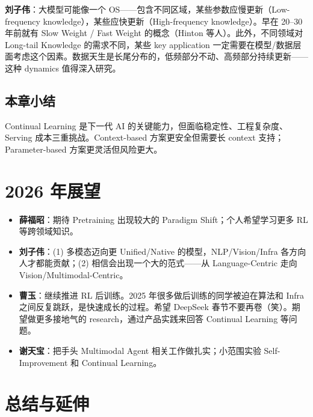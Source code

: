 \documentclass[a4paper]{article}
\begin{document}
\textbf{刘子伟}：大模型可能像一个 OS——包含不同区域，某些参数应慢更新（Low-frequency knowledge），某些应快更新（High-frequency knowledge）。早在 20--30 年前就有 Slow Weight / Fast Weight 的概念（Hinton 等人）。此外，不同领域对 Long-tail Knowledge 的需求不同，某些 key application 一定需要在模型/数据层面考虑这个因素。数据天生是长尾分布的，低频部分不动、高频部分持续更新——这种 dynamics 值得深入研究。

\subsection{本章小结}
Continual Learning 是下一代 AI 的关键能力，但面临稳定性、工程复杂度、Serving 成本三重挑战。Context-based 方案更安全但需要长 context 支持；Parameter-based 方案更灵活但风险更大。

\section{2026 年展望}

\begin{itemize}
  \item \textbf{薛福昭}：期待 Pretraining 出现较大的 Paradigm Shift；个人希望学习更多 RL 等跨领域知识。
  \item \textbf{刘子伟}：(1) 多模态迈向更 Unified/Native 的模型，NLP/Vision/Infra 各方向人才都能贡献；(2) 相信会出现一个大的范式——从 Language-Centric 走向 Vision/Multimodal-Centric。
  \item \textbf{曹玉}：继续推进 RL 后训练。2025 年很多做后训练的同学被迫在算法和 Infra 之间反复跳跃，是快速成长的过程。希望 DeepSeek 春节不要再卷（笑）。期望做更多接地气的 research，通过产品实践来回答 Continual Learning 等问题。
  \item \textbf{谢天宝}：把手头 Multimodal Agent 相关工作做扎实；小范围实验 Self-Improvement 和 Continual Learning。
\end{itemize}

\section{总结与延伸}
\end{document}
